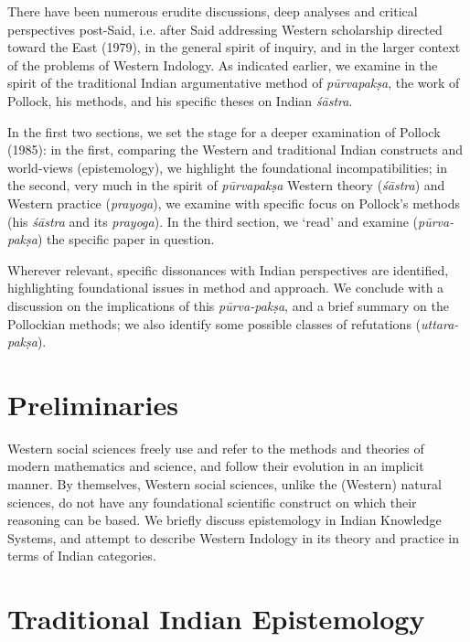 There have been numerous erudite discussions, deep analyses and critical perspectives post-Said, i.e. after Said  addressing Western scholarship directed toward the East (1979), in the general spirit of inquiry, and in the larger context of the problems of Western Indology. As indicated earlier, we examine in the spirit of the traditional Indian argumentative method of {\sl pūrvapakṣa}, the work of Pollock, his methods, and his specific theses on Indian {\sl śāstra}.  

In the first two sections, we set the stage for a deeper examination of Pollock (1985): in the first, comparing the Western and traditional Indian constructs and world-views (epistemology), we highlight the foundational incompatibilities; in the second, very much in the spirit of {\sl pūrvapakṣa} Western theory ({\sl śāstra}) and Western practice ({\sl prayoga}), we examine with specific focus on Pollock's methods (his {\sl śāstra} and its {\sl prayoga}). In the third section, we `read' and examine ({\sl pūrva-pakṣa}) the specific paper in question. 
\newpage

Wherever relevant, specific dissonances with Indian perspectives are identified, highlighting foundational issues in method and approach. We conclude with a discussion on the implications of this {\sl pūrva-pakṣa}, and a brief summary on the Pollockian methods; we also identify some possible classes of refutations ({\sl uttara-pakṣa}).\\[-20pt]

\section*{Preliminaries}

Western social sciences freely use and refer to the methods and theories of modern mathematics and science, and follow their evolution in an implicit manner.  By themselves, Western social sciences, unlike the (Western) natural sciences, do not have any foundational scientific construct on which their reasoning can be based. We briefly discuss epistemology in Indian Knowledge Systems, and attempt to describe Western Indology in its theory and practice in terms of Indian categories.\\[-20pt]

\section*{Traditional Indian Epistemology}

